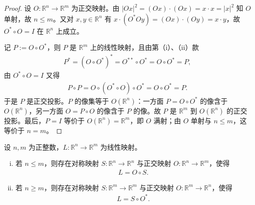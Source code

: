 \documentclass[../../main.tex]{subfiles}%
\begin{document}
\begin{proof}
设 $O:\mathbb{R}^n\to\mathbb{R}^m$ 为正交映射。由 $\lvert Ox\rvert^2=(Ox)\cdot(Ox)=x\cdot x=\lvert x\rvert^2$ 知 $O$ 单射，故 $n\leqslant m$。又对 $x,y\in\mathbb{R}^n$ 有 $x\cdot(O^*Oy)=(Ox)\cdot(Oy)=x\cdot y$，故 $O^*\circ O=I$ 在 $\mathbb{R}^n$ 上成立。

记 $P:=O\circ O^*$，则 $P$ 是 $\mathbb{R}^m$ 上的线性映射，且由第（i）、（ii）款
\begin{align*}
P^*=(O\circ O^*)^*=O^{**}\circ O^*=O\circ O^*=P,
\end{align*}
由 $O^*\circ O=I$ 又得
\begin{align*}
P\circ P=O\circ(O^*\circ O)\circ O^*=O\circ O^*=P.
\end{align*}
于是 $P$ 是正交投影。$P$ 的像集等于 $O(\mathbb{R}^n)$：一方面 $P=O\circ O^*$ 的像含于 $O(\mathbb{R}^n)$，另一方面 $O=P\circ O$ 的像含于 $P$ 的像。故 $P$ 是 $\mathbb{R}^m$ 到 $O(\mathbb{R}^n)$ 的正交投影。最后，$P=I$ 等价于 $O(\mathbb{R}^n)=\mathbb{R}^m$，即 $O$ 满射；由 $O$ 单射与 $n\leqslant m$，这等价于 $n=m$。
\end{proof}

\begin{theorem}[极分解]\label{theorem:ch03-3-5}
设 $n,m$ 为正整数，$L:\mathbb{R}^n\to\mathbb{R}^m$ 为线性映射。
\begin{enumerate}[(i)]
\item 若 $n\leqslant m$，则存在对称映射 $S:\mathbb{R}^n\to\mathbb{R}^n$ 与正交映射 $O:\mathbb{R}^n\to\mathbb{R}^m$，使得
\begin{align*}
L=O\circ S.
\end{align*}
\item 若 $n\geqslant m$，则存在对称映射 $S:\mathbb{R}^m\to\mathbb{R}^m$ 与正交映射 $O:\mathbb{R}^m\to\mathbb{R}^n$，使得
\begin{align*}
L=S\circ O^*.
\end{align*}
\end{enumerate}
\end{theorem}
\end{document}
